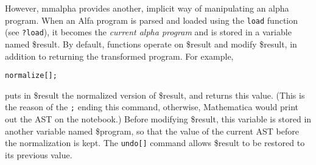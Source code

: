\documentclass[11pt]{report}
\newcommand{\MMAlpha}{{\sc mmalpha}}
\newcommand{\Alfa}{{\sc alpha}}
\newcommand{\mma}{{\sc Mathematica}}
\newcommand{\alfa}{{\sc alpha}}
\begin{document}
However, \MMAlpha{} provides another, implicit way of manipulating
an \Alfa{} program. When an Alfa{} program is parsed and loaded
using the \texttt{load} function (see \texttt{?load}), 
it becomes the {\em current \alfa{} 
program} and is stored in a variable 
named \$result. By default, functions operate on \$result and 
modify \$result, in addition to returning the transformed program.
For example, 
\begin{verbatim}
normalize[];
\end{verbatim}
puts in \$result the normalized version of \$result, and 
returns this value. (This is the reason of the \texttt{;} ending
this command, otherwise, \mma{} would print out the AST on the notebook.)
Before modifying \$result, this variable is stored in another variable
named \$program, so that the value of the current AST before 
the normalization is kept. The \texttt{undo[]} command allows 
\$result to be restored to its previous value.
\end{document}
